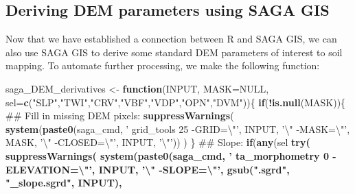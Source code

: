 \documentclass[graybox,natbib,nospthms,UStrade]{svmono}
\newenvironment{Shaded}{\begin{snugshade}}{\end{snugshade}}
\newcommand{\CharTok}[1]{\textcolor[rgb]{0.5,0.5,0.5}{#1}}
\newcommand{\ControlFlowTok}[1]{\textcolor[rgb]{0.27,0.27,0.27}{\textbf{#1}}}
\newcommand{\DataTypeTok}[1]{\textcolor[rgb]{0.27,0.27,0.27}{#1}}
\newcommand{\KeywordTok}[1]{\textcolor[rgb]{0.27,0.27,0.27}{\textbf{#1}}}
\newcommand{\NormalTok}[1]{#1}
\newcommand{\OperatorTok}[1]{\textcolor[rgb]{0.43,0.43,0.43}{\textbf{#1}}}
\newcommand{\OtherTok}[1]{\textcolor[rgb]{0.37,0.37,0.37}{#1}}
\newcommand{\StringTok}[1]{\textcolor[rgb]{0.5,0.5,0.5}{#1}}
\begin{document}
\hypertarget{deriving-dem-parameters-using-saga-gis}{%
\subsection{Deriving DEM parameters using SAGA GIS}\label{deriving-dem-parameters-using-saga-gis}}

Now that we have established a connection between R and SAGA GIS, we can also use SAGA GIS to derive some standard DEM parameters of interest to soil mapping. To automate further processing, we make the following function:

\begin{Shaded}
\begin{Highlighting}[]
\NormalTok{saga_DEM_derivatives <-}\StringTok{ }\ControlFlowTok{function}\NormalTok{(INPUT, }\DataTypeTok{MASK=}\OtherTok{NULL}\NormalTok{, }
                                 \DataTypeTok{sel=}\KeywordTok{c}\NormalTok{(}\StringTok{"SLP"}\NormalTok{,}\StringTok{"TWI"}\NormalTok{,}\StringTok{"CRV"}\NormalTok{,}\StringTok{"VBF"}\NormalTok{,}\StringTok{"VDP"}\NormalTok{,}\StringTok{"OPN"}\NormalTok{,}\StringTok{"DVM"}\NormalTok{))\{}
  \ControlFlowTok{if}\NormalTok{(}\OperatorTok{!}\KeywordTok{is.null}\NormalTok{(MASK))\{}
\NormalTok{    ## Fill in missing DEM pixels:}
    \KeywordTok{suppressWarnings}\NormalTok{( }\KeywordTok{system}\NormalTok{(}\KeywordTok{paste0}\NormalTok{(saga_cmd, }
                                    \StringTok{' grid_tools 25 -GRID=}\CharTok{\textbackslash{}"}\StringTok{'}\NormalTok{, INPUT, }
                                    \StringTok{'}\CharTok{\textbackslash{}"}\StringTok{ -MASK=}\CharTok{\textbackslash{}"}\StringTok{'}\NormalTok{, MASK, }\StringTok{'}\CharTok{\textbackslash{}"}\StringTok{ -CLOSED=}\CharTok{\textbackslash{}"}\StringTok{'}\NormalTok{, }
\NormalTok{                                    INPUT, }\StringTok{'}\CharTok{\textbackslash{}"}\StringTok{'}\NormalTok{)) )}
\NormalTok{  \}}
\NormalTok{  ## Slope:}
  \ControlFlowTok{if}\NormalTok{(}\KeywordTok{any}\NormalTok{(sel }\OperatorTok{%
    \KeywordTok{try}\NormalTok{( }\KeywordTok{suppressWarnings}\NormalTok{( }\KeywordTok{system}\NormalTok{(}\KeywordTok{paste0}\NormalTok{(saga_cmd, }
                                         \StringTok{' ta_morphometry 0 -ELEVATION=}\CharTok{\textbackslash{}"}\StringTok{'}\NormalTok{, }
\NormalTok{                                         INPUT, }\StringTok{'}\CharTok{\textbackslash{}"}\StringTok{ -SLOPE=}\CharTok{\textbackslash{}"}\StringTok{'}\NormalTok{, }
                                         \KeywordTok{gsub}\NormalTok{(}\StringTok{".sgrd"}\NormalTok{, }\StringTok{"_slope.sgrd"}\NormalTok{, INPUT), }
}
\end{Highlighting}
\end{Shaded}
\end{document}
